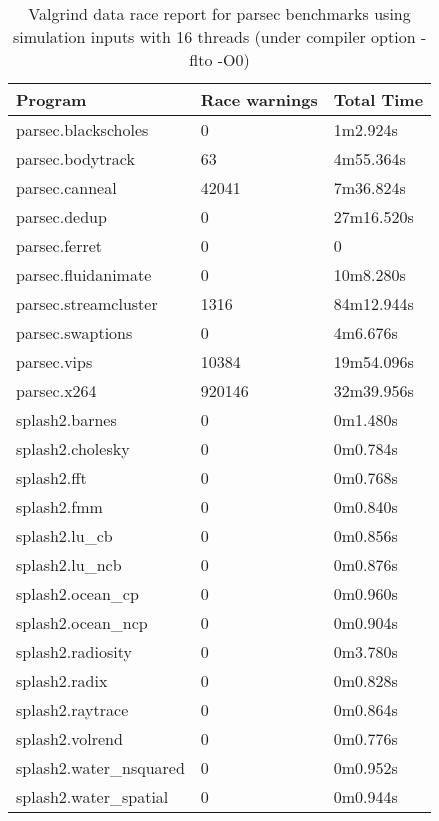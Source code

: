 \begin{table}[htdp]
\begin{center}
\begin{tabular}{|l|l|l|}\hline \hline
 Program & Race warnings  & Total Time  \\ \hline \hline
parsec.blackscholes &  0 &  1m2.924s \\ \hline
parsec.bodytrack &  63 &  4m55.364s \\ \hline
parsec.canneal &  42041 &  7m36.824s \\ \hline
parsec.dedup &  0 &  27m16.520s \\ \hline
parsec.ferret &  0 &  0 \\ \hline
parsec.fluidanimate &  0 &  10m8.280s \\ \hline
parsec.streamcluster &  1316 &  84m12.944s \\ \hline
parsec.swaptions &  0 &  4m6.676s \\ \hline
parsec.vips &  10384 &  19m54.096s \\ \hline
parsec.x264 &  920146 &  32m39.956s \\ \hline
splash2.barnes &  0 &  0m1.480s \\ \hline
splash2.cholesky &  0 &  0m0.784s \\ \hline
splash2.fft &  0 &  0m0.768s \\ \hline
splash2.fmm &  0 &  0m0.840s \\ \hline
splash2.lu\_cb &  0 &  0m0.856s \\ \hline
splash2.lu\_ncb &  0 &  0m0.876s \\ \hline
splash2.ocean\_cp &  0 &  0m0.960s \\ \hline
splash2.ocean\_ncp &  0 &  0m0.904s \\ \hline
splash2.radiosity &  0 &  0m3.780s \\ \hline
splash2.radix &  0 &  0m0.828s \\ \hline
splash2.raytrace &  0 &  0m0.864s \\ \hline
splash2.volrend &  0 &  0m0.776s \\ \hline
splash2.water\_nsquared &  0 &  0m0.952s \\ \hline
splash2.water\_spatial &  0 &  0m0.944s \\ \hline
\end{tabular}

\end{center}
\caption{Valgrind data race report for parsec benchmarks using simulation inputs with 16 threads (under compiler option -flto -O0)}
\label{valgrind}
\end{table}%





